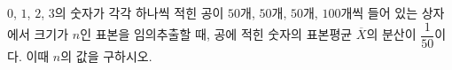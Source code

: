 $0$, $1$, $2$, $3$의 숫자가 각각 하나씩 적힌 공이 $50$개, $50$개, $50$개, $100$개씩 들어 있는 상자에서 크기가 $n$인 표본을 임의추출할 때, 공에 적힌 숫자의 표본평균 $\overline{X}$의 분산이 $\dfrac{1}{50}$이다. 이때 $n$의 값을 구하시오.
